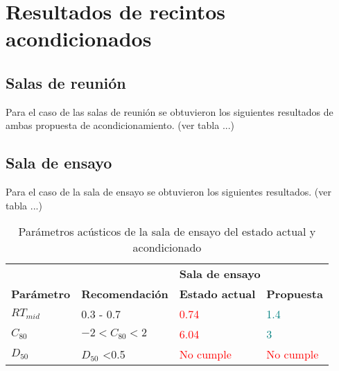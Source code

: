 \section{Resultados de recintos acondicionados}
\subsection{Salas de reunión}
Para el caso de las salas de reunión se obtuvieron los siguientes resultados de ambas propuesta de acondicionamiento. (ver tabla ...)
\subsection{Sala de ensayo}
Para el caso de la sala de ensayo se obtuvieron los siguientes resultados. (ver tabla ...)
\begin{table}[H]
    \begin{tabular}{|l|l|ll|}
    \hline
     &  & \multicolumn{2}{l|}{\textbf{Sala de ensayo}} \\ \cline{3-4} 
    \multirow{-2}{*}{\textbf{Parámetro}} & \multirow{-2}{*}{\textbf{Recomendación}} & \multicolumn{1}{l|}{\textbf{Estado actual}} & \textbf{Propuesta} \\ \hline
    $RT_{mid}$ & 0.3 - 0.7 & \multicolumn{1}{l|}{\textcolor{red}{0.74}} & \textcolor{teal}{1.4} \\ \hline
    $C_{80}$ & $-2<C_{80}<2$ & \multicolumn{1}{l|}{\textcolor{red}{6.04}} & \textcolor{teal}{3} \\ \hline
    $D_{50}$ & $D_{50}$ \textless 0.5 & \multicolumn{1}{l|}{\textcolor{red}{No cumple}} & \textcolor{red}{No cumple} \\ \hline
    \end{tabular}
    \caption{Parámetros acústicos de la sala de ensayo del estado actual y acondicionado}
    \label{tab: resultados sala de ensayo}
\end{table}